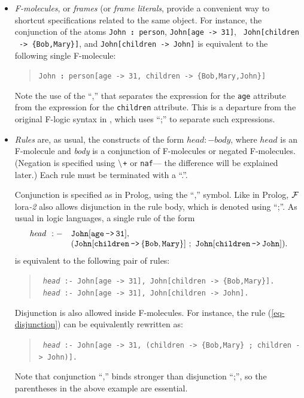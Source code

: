 \documentclass[11pt]{article}
\newcommand{\isa}{\,{\bf{:}}\,}
\newcommand{\mvd}{{\mbox{\tt \,->\,}}}  %
\newcommand{\FLORA}{{\mbox{\sc ${\cal F}${lora}\rm\emph{-2}}}\xspace}
\newcommand{\fl}{\mbox{F-logic}\xspace}
\newcommand{\PLGNAF}{\mbox{\tt \ensuremath{\tt\backslash}+}\xspace}
\newcommand{\RULELOGNAF}{{{\tt naf}}\xspace}
\begin{document}
\begin{itemize}
\item
  \emph{F-molecules}, or \emph{frames} (or \emph{frame literals},
  provide a convenient way to shortcut specifications
  related to the same object. For instance, the conjunction of the atoms
  {\tt John{\isa}person}, {\tt John[age{\mvd}31]}, {\tt
  John[children \mvd \{Bob,Mary\}]}, and {\tt John[children\mvd John]}
  is equivalent to the following single F-molecule:
  \begin{quote}
    {\tt John{\isa}person[age{\mvd}31, children\mvd\{Bob,Mary,John\}]} 
  \end{quote}
  Note the use of the ``,'' that separates the expression for the {\tt age}
  attribute from the expression for the {\tt children} attribute. This is a
  departure from the original \fl syntax in \cite{KLW95}, which uses ``;'' 
  to separate such expressions.
  
\item \emph{Rules} are, as usual, the constructs of the form $head :-
  body$, where $head$ is an F-molecule and \emph{body} is a conjunction of
  F-molecules or negated F-molecules. (Negation is specified using {\PLGNAF}
    or \RULELOGNAF --- the difference will be explained later.)
  Each rule must be terminated with a ``.''.
  
  Conjunction is specified as in Prolog, using the ``,'' symbol. Like in
  Prolog, \FLORA also allows disjunction in the rule body, which is denoted
  using ``;''. As usual in logic languages, a single rule of the form
  \begin{equation}\label{eq-disjunction}
    \begin{array}{rl}
    {\it head}~:- & \tt John[age{\mvd}31],\\
                  & \tt (John[children\mvd\{Bob,Mary\}]~;~ John[children\mvd John]).
    \end{array}
  \end{equation}
  is equivalent to the following pair of rules:
  \begin{quote}
  {\tt
    {\it head}~:-~John[age{\mvd}31],~John[children\mvd\{Bob,Mary\}].
    }
  \\
  {\tt
    {\it head}~:-~John[age{\mvd}31],~John[children\mvd John].
    }
  \end{quote}
  Disjunction is also allowed inside F-molecules. For instance, the rule
  (\ref{eq-disjunction}) can be equivalently rewritten as:
  \begin{quote}
 {\tt
   {\it head}~:-~John[age{\mvd}31,~(children\mvd\{Bob,Mary\}~;~children\mvd John)].
   }
  \end{quote}
  Note that conjunction ``,'' binds stronger than disjunction ``;'', so the
  parentheses in the above example are essential.
  

\end{itemize}
\end{document}
